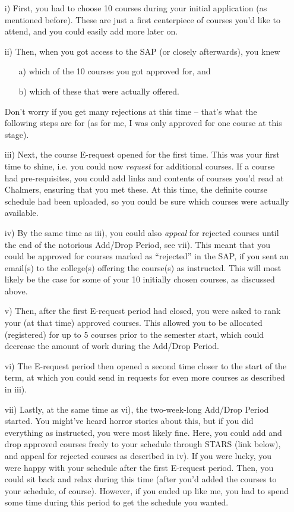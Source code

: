 \begin{enumerate}
    \item[i)] First, you had to choose 10 courses during your initial application (as mentioned before). These are just a first centerpiece of courses you'd like to attend, and you could easily add more later on.
    \item[ii)] Then, when you got access to the SAP (or closely afterwards), you knew 
    \begin{enumerate}
        \item[a)] which of the 10 courses you got approved for, and
        \item[b)] which of these that were actually offered.
    \end{enumerate}
    Don't worry if you get many rejections at this time -- that's what the following steps are for (as for me, I was only approved for one course at this stage).
    \item[iii)] Next, the course E-request opened for the first time. This was your first time to shine, i.e. you could now \textit{request} for additional courses. If a course had pre-requisites, you could add links and contents of courses you'd read at Chalmers, ensuring that you met these. At this time, the definite course schedule had been uploaded, so you could be sure which courses were actually available.
    \item[iv)] By the same time as iii), you could also \textit{appeal} for rejected courses until the end of the notorious Add/Drop Period, see vii). This meant that you could be approved for courses marked as ``rejected'' in the SAP, if you sent an email(s) to the college(s) offering the course(s) as instructed. This will most likely be the case for some of your 10 initially chosen courses, as discussed above.
    \item[v)] Then, after the first E-request period had closed, you were asked to rank your (at that time) approved courses. This allowed you to be allocated (registered) for up to 5 courses prior to the semester start, which could decrease the amount of work during the Add/Drop Period.
    \item[vi)] The E-request period then opened a second time closer to the start of the term, at which you could send in requests for even more courses as described in iii). 
    \item[vii)] Lastly, at the same time as vi), the two-week-long Add/Drop Period started. You might've heard horror stories about this, but if you did everything as instructed, you were most likely fine. Here, you could add and drop approved courses freely to your schedule through STARS (link below), and appeal for rejected courses as described in iv). If you were lucky, you were happy with your schedule after the first E-request period. Then, you could sit back and relax during this time (after you'd added the courses to your schedule, of course). However, if you ended up like me, you had to spend some time during this period to get the schedule you wanted.
\end{enumerate}
